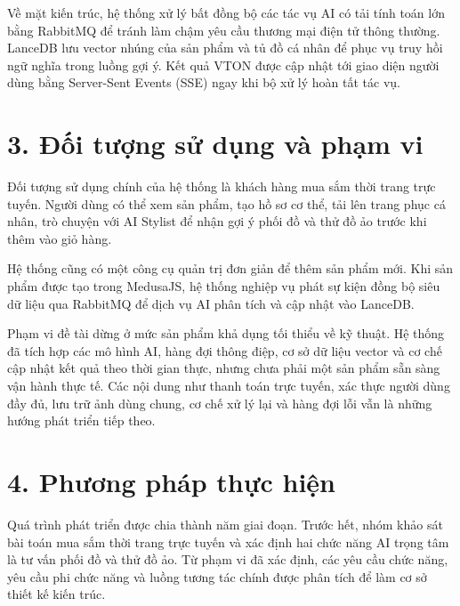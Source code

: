 \medskip

Về mặt kiến trúc, hệ thống xử lý bất đồng bộ các tác vụ AI có tải tính toán lớn bằng RabbitMQ để tránh làm chậm yêu cầu thương mại điện tử thông thường. LanceDB lưu vector nhúng của sản phẩm và tủ đồ cá nhân để phục vụ truy hồi ngữ nghĩa trong luồng gợi ý. Kết quả VTON được cập nhật tới giao diện người dùng bằng Server-Sent Events (SSE) ngay khi bộ xử lý hoàn tất tác vụ.

\section*{3. Đối tượng sử dụng và phạm vi}
{}

Đối tượng sử dụng chính của hệ thống là khách hàng mua sắm thời trang trực tuyến. Người dùng có thể xem sản phẩm, tạo hồ sơ cơ thể, tải lên trang phục cá nhân, trò chuyện với AI Stylist để nhận gợi ý phối đồ và thử đồ ảo trước khi thêm vào giỏ hàng.

\medskip

Hệ thống cũng có một công cụ quản trị đơn giản để thêm sản phẩm mới. Khi sản phẩm được tạo trong MedusaJS, hệ thống nghiệp vụ phát sự kiện đồng bộ siêu dữ liệu qua RabbitMQ để dịch vụ AI phân tích và cập nhật vào LanceDB.

\medskip

Phạm vi đề tài dừng ở mức sản phẩm khả dụng tối thiểu về kỹ thuật. Hệ thống đã tích hợp các mô hình AI, hàng đợi thông điệp, cơ sở dữ liệu vector và cơ chế cập nhật kết quả theo thời gian thực, nhưng chưa phải một sản phẩm sẵn sàng vận hành thực tế. Các nội dung như thanh toán trực tuyến, xác thực người dùng đầy đủ, lưu trữ ảnh dùng chung, cơ chế xử lý lại và hàng đợi lỗi vẫn là những hướng phát triển tiếp theo.

\section*{4. Phương pháp thực hiện}
{}

Quá trình phát triển được chia thành năm giai đoạn. Trước hết, nhóm khảo sát bài toán mua sắm thời trang trực tuyến và xác định hai chức năng AI trọng tâm là tư vấn phối đồ và thử đồ ảo. Từ phạm vi đã xác định, các yêu cầu chức năng, yêu cầu phi chức năng và luồng tương tác chính được phân tích để làm cơ sở thiết kế kiến trúc.

\medskip

